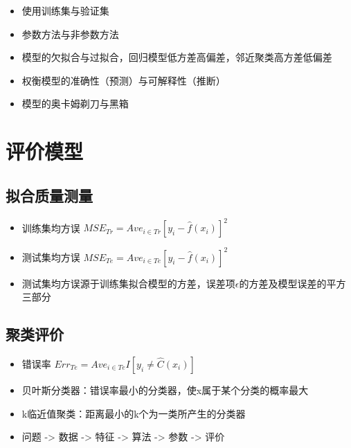 \documentclass[
]{book}
\providecommand{\tightlist}{%
  \setlength{\itemsep}{0pt}\setlength{\parskip}{0pt}}
\begin{document}
\begin{itemize}
\tightlist
\item
  使用训练集与验证集
\item
  参数方法与非参数方法
\item
  模型的欠拟合与过拟合，回归模型低方差高偏差，邻近聚类高方差低偏差
\item
  权衡模型的准确性（预测）与可解释性（推断）
\item
  模型的奥卡姆剃刀与黑箱
\end{itemize}

\hypertarget{ux8bc4ux4ef7ux6a21ux578b}{%
\section{评价模型}\label{ux8bc4ux4ef7ux6a21ux578b}}

\hypertarget{ux62dfux5408ux8d28ux91cfux6d4bux91cf}{%
\subsection{拟合质量测量}\label{ux62dfux5408ux8d28ux91cfux6d4bux91cf}}

\begin{itemize}
\tightlist
\item
  训练集均方误 \(MSE_{Tr} = Ave_{i \in Tr}[y_{i} − \hat f(x_i)]^2\)
\item
  测试集均方误 \(MSE_{Te} = Ave_{i \in Te}[y_{i} − \hat f(x_i)]^2\)
\item
  测试集均方误源于训练集拟合模型的方差，误差项\(\epsilon\)的方差及模型误差的平方三部分
\end{itemize}

\hypertarget{ux805aux7c7bux8bc4ux4ef7}{%
\subsection{聚类评价}\label{ux805aux7c7bux8bc4ux4ef7}}

\begin{itemize}
\item
  错误率 \(Err_{Te} = Ave_{i \in Te}I[y_i \neq \hat C(x_i)]\)
\item
  贝叶斯分类器：错误率最小的分类器，使x属于某个分类的概率最大
\item
  k临近值聚类：距离最小的k个为一类所产生的分类器
\item
  问题 -\textgreater{} 数据 -\textgreater{} 特征 -\textgreater{} 算法 -\textgreater{} 参数 -\textgreater{} 评价
\end{itemize}
\end{document}
